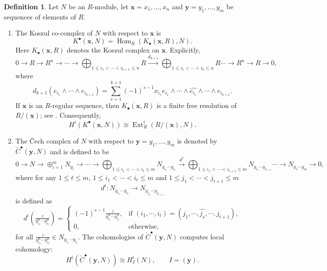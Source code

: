 \documentclass[12pt,twoside, final]{amsart}
\numberwithin{equation}{section}
\theoremstyle{definition}
\newtheorem{definition}[theorem]{Definition}
\newcommand{\Ext}{\operatorname{Ext}}
\newcommand{\Hom}{\operatorname{Hom}}
\begin{document}
\begin{definition}
Let $N$ be an $R$-module, let
$\mathbf x=x_1,\ldots,x_n$ and
$\mathbf y=y_1,\ldots,y_m$ be sequences of elements of $R$.
\begin{enumerate}
    \item 

The Koszul co-complex of $N$ with respect to $\mathbf x$ is
\[
K^\bullet(\mathbf x,N)
=
\Hom_R(K_\bullet(\mathbf x,R),N).
\]
Here $K_\bullet(\mathbf x,R)$ denotes the Koszul complex on
$\mathbf x$. Explicitly,
\[
0\longrightarrow R
\longrightarrow R^n
\longrightarrow\cdots\longrightarrow
\bigoplus_{1\leq i_1<\cdots<i_{k+ 1}\leq n} R
\xrightarrow{d_{k+ 1}}
\bigoplus_{1\leq i_1<\cdots<i_k\leq n} R
\cdots\rightarrow R^n\longrightarrow R
\longrightarrow0,
\]
where
\[
d_{k+1}(e_{i_1}\wedge\cdots\wedge e_{i_{k+1}})
=
\sum_{s=1}^{k+1}(-1)^{s-1}x_{i_s}
e_{i_1}\wedge\cdots\wedge
\widehat{e_{i_s}}\wedge\cdots\wedge e_{i_{k+1}}.
\]
If $\mathbf x$ is an $R$-regular sequence, then
$K_\bullet(\mathbf x,R)$ is a finite free resolution of
$R/(\mathbf x)$; see \cite[Chapter 1]{BH}.
Consequently,
\begin{equation}\label{koszul}
    H^i(K^\bullet(\mathbf x,N))
\cong
\Ext_R^i(R/(\mathbf x),N).
\end{equation}
 
\item
The \v{C}ech complex of $N$ with respect to
$\mathbf y=y_1,\ldots,y_m$ is denoted by
$\check C^\bullet(\mathbf y,N)$ and  is defined to be 
   \[0\rightarrow N \rightarrow \oplus_{i= 1}^m N_{y_i}\rightarrow\cdots \rightarrow 
   \bigoplus_{1\leq i_1<\cdots <i_t\leq m}N_{y_{i_1}\cdots y_{i_t}}\stackrel{d^t}{\longrightarrow}\bigoplus_{1\leq i_1<\cdots <i_{t+1}\leq m}N_{y_{i_1}\cdots y_{i_{t+1}}} \cdots  \rightarrow  N_{y_1 \cdots  y_m}\longrightarrow0,\]
   where for any $1\leq t\leq m$, $1\leq i_1<\cdots <i_t\leq m$ and  $1\leq j_1<\cdots <j_{t+ 1}\leq m$ 
   \[d^t:N_{y_{i_1}\cdots y_{i_t}}\longrightarrow N_{y_{j_1}\cdots y_{j_{t+ 1}}} \] is defined as
  \[
   d^i(\tfrac{z}{y_{i_1}^n\cdots y_{i_t}^n})= \begin{cases}
    (-1)^{s- 1} \tfrac{z}{y_{i_1}^n\cdots y_{i_{t }}^n}, & \text{if } (i_1,\cdots, i_t)= (j_1,\cdots, \hat{j_s},\cdots, j_{t+ 1}),\\
     0, & \text{otherwise, } 
 \end{cases}\]
 for all  $\tfrac{z}{y_{i_1}^n\cdots y_{i_t}^n}\in N_{y_{i_1}\cdots y_{i_t}}$.
The cohomologies of $\check C^\bullet(\mathbf y,N)$ computes local
cohomology:
\begin{equation}\label{ceck}
  H^i(\check C^\bullet(\mathbf y,N))
\cong H_I^i(N),
\qquad I=(\mathbf y).  
\end{equation}
 

\end{enumerate}
\end{definition}
\end{document}
